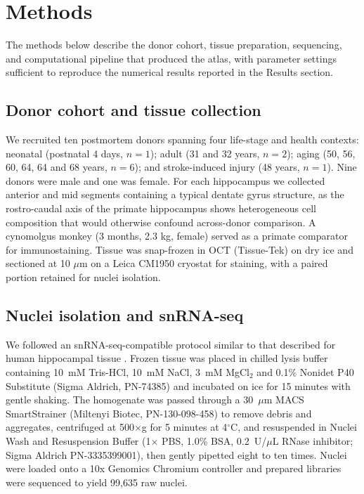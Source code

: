 \documentclass[11pt]{article}
\begin{document}
\section{Methods}

The methods below describe the donor cohort, tissue preparation, sequencing,
and computational pipeline that produced the atlas, with parameter settings
sufficient to reproduce the numerical results reported in the Results
section.

\subsection{Donor cohort and tissue collection}

We recruited ten postmortem donors spanning four life-stage and health
contexts: neonatal (postnatal 4 days, $n=1$); adult (31 and 32 years, $n=2$);
aging (50, 56, 60, 64, 64 and 68 years, $n=6$); and stroke-induced injury
(48 years, $n=1$). Nine donors were male and one was female. For each hippocampus
we collected anterior and mid segments containing a typical dentate gyrus
structure, as the rostro-caudal axis of the primate hippocampus shows
heterogeneous cell composition that would otherwise confound across-donor
comparison. A cynomolgus monkey (3 months, 2.3 kg, female) served as a
primate comparator for immunostaining. Tissue was snap-frozen in OCT
(Tissue-Tek) on dry ice and sectioned at 10 $\mu$m on a Leica CM1950
cryostat for staining, with a paired portion retained for nuclei isolation.

\subsection{Nuclei isolation and snRNA-seq}

We followed an snRNA-seq-compatible protocol similar to that described for
human hippocampal tissue \cite{ayhan2021protocol,habib2017massively}. Frozen
tissue was placed in chilled lysis buffer containing 10~mM Tris-HCl, 10~mM
NaCl, 3~mM MgCl$_2$ and 0.1\% Nonidet P40 Substitute (Sigma Aldrich,
PN-74385) and incubated on ice for 15 minutes with gentle shaking. The
homogenate was passed through a 30~$\mu$m MACS SmartStrainer (Miltenyi
Biotec, PN-130-098-458) to remove debris and aggregates, centrifuged at
500$\times$g for 5 minutes at 4$^\circ$C, and resuspended in Nuclei Wash and
Resuspension Buffer (1$\times$ PBS, 1.0\% BSA, 0.2~U/$\mu$L RNase inhibitor;
Sigma Aldrich PN-3335399001), then gently pipetted eight to ten times.
Nuclei were loaded onto a 10x Genomics Chromium controller and prepared
libraries were sequenced to yield 99{,}635 raw nuclei.
\end{document}
